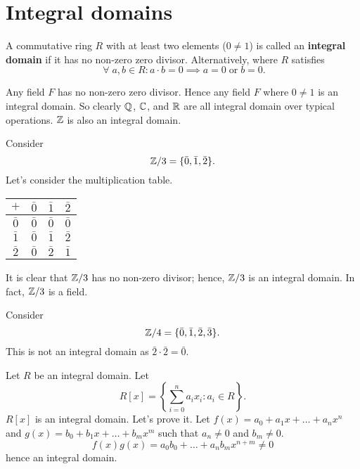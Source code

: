 \chapter{Integral domains}

\begin{definition}
    A commutative ring $R$ with at least two elements ($0 \neq 1$) is called an \textbf{integral domain} if it has no non-zero zero divisor. Alternatively, where $R$ satisfies
    \[ \;\forall\; a, b \in R: a \cdot b = 0 \implies a = 0 \;\text{or}\; b = 0. \]
\end{definition}

\begin{example}
    Any field $F$ has no non-zero zero divisor. Hence any field $F$ where $0 \neq 1$ is an integral domain. So clearly $\mathbb{Q}$, $\mathbb{C}$, and $\mathbb{R}$ are all integral domain over typical operations. $\mathbb{Z}$ is also an integral domain.
\end{example}

\begin{example}
    Consider
    \[ \mathbb{Z}/3 = \{ \bar 0, \bar 1,\bar 2 \}. \]
    Let's consider the multiplication table.
    \begin{center}
        \begin{tabular}{cccc}
            \toprule
            $+$ & $\bar 0$ & $\bar 1$ & $\bar 2$ \\
            \midrule
            $\bar 0$ & $\bar 0$ & $\bar 0$ & $\bar 0$ \\
            $\bar 1$ & $\bar 0$ & $\bar 1$ & $\bar 2$ \\
            $\bar 2$ & $\bar 0$ & $\bar 2$ & $\bar 1$ \\
            \bottomrule
        \end{tabular}
    \end{center}
    It is clear that $\mathbb{Z}/3$ has no non-zero divisor; hence, $\mathbb{Z}/3$ is an integral domain. In fact, $\mathbb{Z}/3$ is a field.
\end{example}

\begin{example}
    Consider
    \[ \mathbb{Z}/4 = \{ \bar 0, \bar 1, \bar 2, \bar3 \}. \]
    This is not an integral domain as $\bar 2 \cdot \bar 2 = \bar 0$.
\end{example}

\begin{example}
    Let $R$ be an integral domain. Let
    \[ R[x] = \left\{ \sum_{i = 0}^n a_i x_i : a_i \in R \right\}. \]
    $R[x]$ is an integral domain. Let's prove it. Let $f(x) = a_0 + a_1x + \ldots + a_nx^n$ and $g(x) = b_0 + b_1x + \ldots + b_mx^m$ such that $a_n \neq 0$ and $b_m \neq 0$. 
    \[ f(x)g(x) = a_0b_0 + \ldots + a_nb_m x^{n + m} \neq 0 \]
    hence an integral domain.
\end{example}

